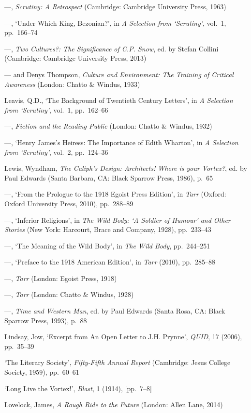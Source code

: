 \documentclass[]{article}
\begin{document}
—, \emph{Scrutiny: A Retrospect} (Cambridge: Cambridge University Press,
1963)

—, ‘Under Which King, Bezonian?’, in \emph{A Selection from ‘Scrutiny’},
vol.~1, pp.~166–74

—, \emph{Two Cultures?: The Significance of C.P. Snow}, ed. by Stefan
Collini (Cambridge: Cambridge University Press, 2013)

— and Denys Thompson, \emph{Culture and Environment: The Training of
Critical Awareness} (London: Chatto \& Windus, 1933)

Leavis, Q.D., ‘The Background of Twentieth Century Letters’, in \emph{A
Selection from ‘Scrutiny’}, vol.~1, pp.~162–66

—, \emph{Fiction and the Reading Public} (London: Chatto \& Windus,
1932)

—, ‘Henry James’s Heiress: The Importance of Edith Wharton’, in \emph{A
Selection from ‘Scrutiny’}, vol.~2, pp.~124–36

Lewis, Wyndham, \emph{The Caliph’s Design: Architects! Where is your
Vortex?}, ed. by Paul Edwards (Santa Barbara, CA: Black Sparrow Press,
1986), p.~65

—, ‘From the Prologue to the 1918 Egoist Press Edition’, in \emph{Tarr}
(Oxford: Oxford University Press, 2010), pp.~288–89

—, ‘Inferior Religions’, in \emph{The Wild Body: ‘A Soldier of Humour’
and Other Stories} (New York: Harcourt, Brace and Company, 1928),
pp.~233–43

—, ‘The Meaning of the Wild Body’, in \emph{The Wild Body}, pp.~244–251

—, ‘Preface to the 1918 American Edition’, in \emph{Tarr} (2010),
pp.~285–88

—, \emph{Tarr} (London: Egoist Press, 1918)

—, \emph{Tarr} (London: Chatto \& Windus, 1928)

—, \emph{Time and Western Man}, ed. by Paul Edwards (Santa Rosa, CA:
Black Sparrow Press, 1993), p.~88

Lindsay, Jow, ‘Excerpt from An Open Letter to J.H. Prynne’, \emph{QUID},
17 (2006), pp.~35–39

‘The Literary Society’, \emph{Fifty-Fifth Annual Report} (Cambridge:
Jesus College Society, 1959), pp.~60–61

‘Long Live the Vortex!’, \emph{Blast}, 1 (1914), {[}pp.~7–8{]}

Lovelock, James, \emph{A Rough Ride to the Future} (London: Allen Lane,
2014)
\end{document}
